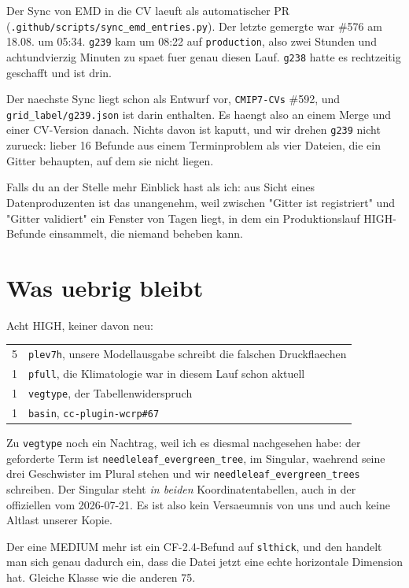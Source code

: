 \documentclass[11pt,a4paper]{article}
\newcommand{\code}[1]{\texttt{\small #1}}
\begin{document}
Der Sync von EMD in die CV laeuft als automatischer PR
(\code{.github/scripts/sync\_emd\_entries.py}). Der letzte gemergte war \#576 am
18.08. um 05:34. \code{g239} kam um 08:22 auf \code{production}, also zwei Stunden
und achtundvierzig Minuten zu spaet fuer genau diesen Lauf. \code{g238} hatte es
rechtzeitig geschafft und ist drin.

Der naechste Sync liegt schon als Entwurf vor, \code{CMIP7-CVs} \#592, und
\code{grid\_label/g239.json} ist darin enthalten. Es haengt also an einem Merge und
einer CV-Version danach. Nichts davon ist kaputt, und wir drehen \code{g239} nicht
zurueck: lieber 16 Befunde aus einem Terminproblem als vier Dateien, die ein Gitter
behaupten, auf dem sie nicht liegen.

Falls du an der Stelle mehr Einblick hast als ich: aus Sicht eines Datenproduzenten
ist das unangenehm, weil zwischen "Gitter ist registriert" und "Gitter validiert"
ein Fenster von Tagen liegt, in dem ein Produktionslauf HIGH-Befunde einsammelt,
die niemand beheben kann.

\section{Was uebrig bleibt}

Acht HIGH, keiner davon neu:

\begin{center}
\begin{tabular}{rl}
\toprule
5 & \code{plev7h}, unsere Modellausgabe schreibt die falschen Druckflaechen \\
1 & \code{pfull}, die Klimatologie war in diesem Lauf schon aktuell \\
1 & \code{vegtype}, der Tabellenwiderspruch \\
1 & \code{basin}, \code{cc-plugin-wcrp\#67} \\
\bottomrule
\end{tabular}
\end{center}

Zu \code{vegtype} noch ein Nachtrag, weil ich es diesmal nachgesehen habe: der
geforderte Term ist \code{needleleaf\_evergreen\_tree}, im Singular, waehrend seine
drei Geschwister im Plural stehen und wir \code{needleleaf\_evergreen\_trees}
schreiben. Der Singular steht \emph{in beiden} Koordinatentabellen, auch in der
offiziellen vom 2026-07-21. Es ist also kein Versaeumnis von uns und auch keine
Altlast unserer Kopie.

Der eine MEDIUM mehr ist ein CF-2.4-Befund auf \code{slthick}, und den handelt man
sich genau dadurch ein, dass die Datei jetzt eine echte horizontale Dimension hat.
Gleiche Klasse wie die anderen 75.
\end{document}
